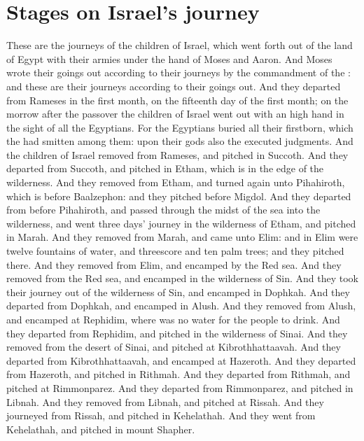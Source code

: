 \section*{Stages on Israel's journey}
\begin{biblechapter} %
\verse These are the journeys of the children of Israel, which went forth out of the land of Egypt with their armies under the hand of Moses and Aaron.
\verse And Moses wrote their goings out according to their journeys by the commandment of the \LORD: and these are their journeys according to their goings out.
\verse And they departed from Rameses in the first month, on the fifteenth day of the first month; on the morrow after the passover the children of Israel went out with an high hand in the sight of all the Egyptians.
\verse For the Egyptians buried all their firstborn, which the \LORD had smitten among them: upon their gods also the \LORD executed judgments.
\verse And the children of Israel removed from Rameses, and pitched in Succoth.
\verse And they departed from Succoth, and pitched in Etham, which is in the edge of the wilderness.
\verse And they removed from Etham, and turned again unto Pihahiroth, which is before Baalzephon: and they pitched before Migdol.
\verse And they departed from before Pihahiroth, and passed through the midst of the sea into the wilderness, and went three days' journey in the wilderness of Etham, and pitched in Marah.
\verse And they removed from Marah, and came unto Elim: and in Elim were twelve fountains of water, and threescore and ten palm trees; and they pitched there.
\verse And they removed from Elim, and encamped by the Red sea.
\verse And they removed from the Red sea, and encamped in the wilderness of Sin.
\verse And they took their journey out of the wilderness of Sin, and encamped in Dophkah.
\verse And they departed from Dophkah, and encamped in Alush.
\verse And they removed from Alush, and encamped at Rephidim, where was no water for the people to drink.
\verse And they departed from Rephidim, and pitched in the wilderness of Sinai.
\verse And they removed from the desert of Sinai, and pitched at Kibrothhattaavah.
\verse And they departed from Kibrothhattaavah, and encamped at Hazeroth.
\verse And they departed from Hazeroth, and pitched in Rithmah.
\verse And they departed from Rithmah, and pitched at Rimmonparez.
\verse And they departed from Rimmonparez, and pitched in Libnah.
\verse And they removed from Libnah, and pitched at Rissah.
\verse And they journeyed from Rissah, and pitched in Kehelathah.
\verse And they went from Kehelathah, and pitched in mount Shapher.

\end{biblechapter}
